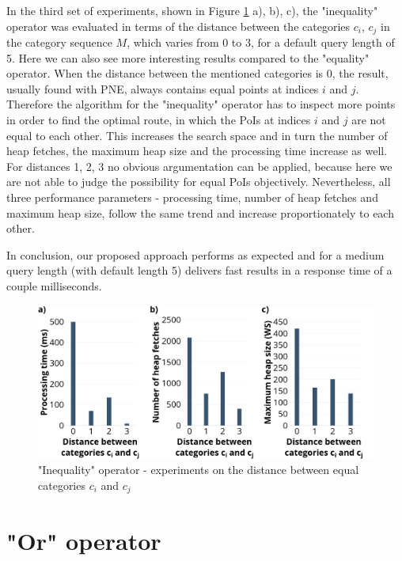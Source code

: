 In the third set of experiments, shown in Figure \ref{fig:neo_distance} a), b), c), the "inequality" operator was evaluated in terms of the  distance between the categories $c_i$, $c_j$ in the category sequence $M$, which varies from 0 to 3, for a default query length of 5.  
Here we can also see more interesting results compared to the "equality" operator. When the distance between the mentioned categories is 0, the result, usually found with PNE, always contains equal points at indices $i$ and $j$. Therefore the algorithm for the "inequality" operator has to inspect more points in order to find the optimal route, in which the PoIs at indices $i$ and $j$ are not equal to each other. This increases the search space and in turn the number of heap fetches, the maximum heap size and the processing time increase as well. For distances 1, 2, 3 no obvious argumentation can be applied, because here we are not able to judge the possibility for equal PoIs objectively.
Nevertheless, all three performance parameters - processing time, number of heap fetches and maximum heap size, follow the same trend and increase proportionately to each other.

In conclusion, our proposed approach performs as expected and for a medium query length (with default length 5) delivers fast results in a response time of a couple milliseconds.

\begin{figure}[H]
	\includegraphics[scale=0.33]{images/neo_distance_30.png}
	\centering
	\caption{"Inequality" operator - experiments on the distance between equal categories $c_i$ and $c_j$}
	\label{fig:neo_distance}
\end{figure}


\section{"Or" operator}
\label{sec:experimentsOr}

